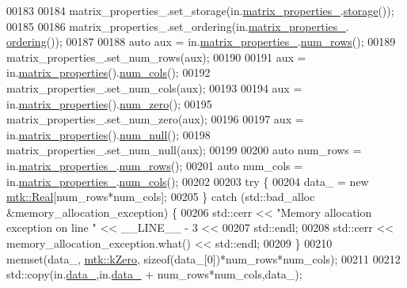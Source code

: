 \begin{DoxyCode}
00183 
00184   matrix\_properties\_.set\_storage(in.\hyperlink{classmtk_1_1DenseMatrix_a481c8d09af685a5ba67acefdcaa810cc}{matrix\_properties\_}.\hyperlink{classmtk_1_1Matrix_a9ffaa665a9cf7371b3be568415a08a3b}{storage}());
00185 
00186   matrix\_properties\_.set\_ordering(in.\hyperlink{classmtk_1_1DenseMatrix_a481c8d09af685a5ba67acefdcaa810cc}{matrix\_properties\_}.
      \hyperlink{classmtk_1_1Matrix_a13cd17621652cd5551ff98549bd94df7}{ordering}());
00187 
00188   \textcolor{keyword}{auto} aux = in.\hyperlink{classmtk_1_1DenseMatrix_a481c8d09af685a5ba67acefdcaa810cc}{matrix\_properties\_}.\hyperlink{classmtk_1_1Matrix_ab308b25b48e4fcd39fc60e0c3fc66dea}{num\_rows}();
00189   matrix\_properties\_.set\_num\_rows(aux);
00190 
00191   aux = in.\hyperlink{classmtk_1_1DenseMatrix_a5aa83a0643f27a4652ea97630edf7143}{matrix\_properties}().\hyperlink{classmtk_1_1Matrix_a2160118d0edf51cf2aaa806ee1b915f8}{num\_cols}();
00192   matrix\_properties\_.set\_num\_cols(aux);
00193 
00194   aux = in.\hyperlink{classmtk_1_1DenseMatrix_a5aa83a0643f27a4652ea97630edf7143}{matrix\_properties}().\hyperlink{classmtk_1_1Matrix_a17f99bfdf7b8071962c37550028c22b5}{num\_zero}();
00195   matrix\_properties\_.set\_num\_zero(aux);
00196 
00197   aux = in.\hyperlink{classmtk_1_1DenseMatrix_a5aa83a0643f27a4652ea97630edf7143}{matrix\_properties}().\hyperlink{classmtk_1_1Matrix_a79ac4c1b31cef05b41a123917b0ad32f}{num\_null}();
00198   matrix\_properties\_.set\_num\_null(aux);
00199 
00200   \textcolor{keyword}{auto} num\_rows = in.\hyperlink{classmtk_1_1DenseMatrix_a481c8d09af685a5ba67acefdcaa810cc}{matrix\_properties\_}.\hyperlink{classmtk_1_1Matrix_ab308b25b48e4fcd39fc60e0c3fc66dea}{num\_rows}();
00201   \textcolor{keyword}{auto} num\_cols = in.\hyperlink{classmtk_1_1DenseMatrix_a481c8d09af685a5ba67acefdcaa810cc}{matrix\_properties\_}.\hyperlink{classmtk_1_1Matrix_a2160118d0edf51cf2aaa806ee1b915f8}{num\_cols}();
00202 
00203   \textcolor{keywordflow}{try} \{
00204     data\_ = \textcolor{keyword}{new} \hyperlink{group__c01-roots_gac080bbbf5cbb5502c9f00405f894857d}{mtk::Real}[num\_rows*num\_cols];
00205   \} \textcolor{keywordflow}{catch} (std::bad\_alloc &memory\_allocation\_exception) \{
00206     std::cerr << \textcolor{stringliteral}{"Memory allocation exception on line "} << \_\_LINE\_\_ - 3 <<
00207       std::endl;
00208     std::cerr << memory\_allocation\_exception.what() << std::endl;
00209   \}
00210   memset(data\_, \hyperlink{group__c01-roots_ga59a451a5fae30d59649bcda274fea271}{mtk::kZero}, \textcolor{keyword}{sizeof}(data\_[0])*num\_rows*num\_cols);
00211 
00212   std::copy(in.\hyperlink{classmtk_1_1DenseMatrix_a7893e4e5c8d2e2de32b156177e78cb6f}{data\_},in.\hyperlink{classmtk_1_1DenseMatrix_a7893e4e5c8d2e2de32b156177e78cb6f}{data\_} + num\_rows*num\_cols,data\_);

\end{DoxyCode}
